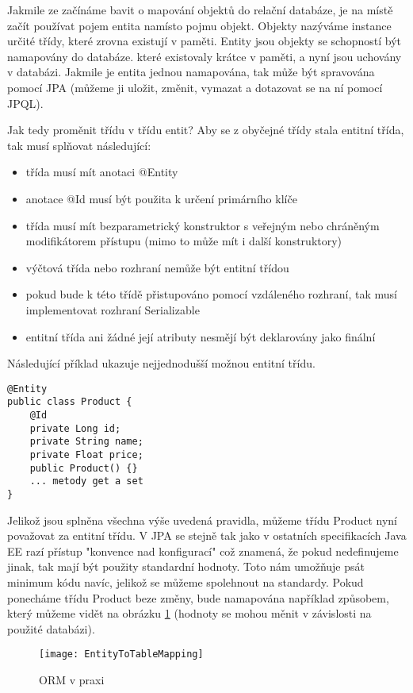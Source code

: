 \documentclass[122pt,oneside]{fithesis}
\begin{document}
Jakmile ze začínáme bavit o mapování objektů do relační databáze, je na místě začít používat pojem entita namísto pojmu objekt. Objekty nazýváme instance určité třídy, které zrovna existují v paměti. Entity jsou objekty se schopností být namapovány do databáze. které existovaly krátce v paměti, a nyní jsou uchovány v databázi. Jakmile je entita jednou namapována, tak může být spravována pomocí JPA (můžeme ji uložit, změnit, vymazat a dotazovat se na ní pomocí JPQL).

Jak tedy proměnit třídu v třídu entit? Aby se z obyčejné třídy stala entitní třída, tak musí splňovat následující:
\begin{itemize}
  \item třída musí mít anotaci @Entity
  \item anotace @Id musí být použita k určení primárního klíče
  \item třída musí mít bezparametrický konstruktor s veřejným nebo chráněným modifikátorem přístupu (mimo to může mít i další konstruktory)
  \item výčtová třída nebo rozhraní nemůže být entitní třídou
  \item pokud bude k této třídě přistupováno pomocí vzdáleného rozhraní, tak musí implementovat rozhraní Serializable
  \item entitní třída ani žádné její atributy nesmějí být deklarovány jako finální
\end{itemize}

Následující příklad ukazuje nejjednodušší možnou entitní třídu.

\begin{lstlisting}
@Entity
public class Product {
	@Id
	private Long id;
	private String name;
	private Float price;
	public Product() {}
	... metody get a set
}
\end{lstlisting}

Jelikož jsou splněna všechna výše uvedená pravidla, můžeme třídu Product nyní považovat za entitní třídu. V JPA se stejně tak jako v ostatních specifikacích Java EE razí přístup "konvence nad konfigurací" což znamená, že pokud nedefinujeme jinak, tak mají být použity standardní hodnoty. Toto nám umožňuje psát minimum kódu navíc, jelikož se můžeme spolehnout na standardy. Pokud ponecháme třídu Product beze změny, bude namapována například způsobem, který můžeme vidět na obrázku \ref{fig:orm} (hodnoty se mohou měnit v závislosti na použité databázi).

\begin{figure}[!ht]
\centering
\texttt{[image: EntityToTableMapping]}
\caption{ORM v praxi}
\label{fig:orm}
\end{figure}
\end{document}
